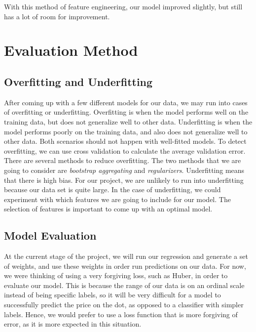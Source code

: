 \documentclass{article}
\begin{document}
With this method of feature engineering, our model improved slightly, but still has a lot of room for improvement.

\section{Evaluation Method}
\subsection{Overfitting and Underfitting}
After coming up with a few different models for our data, we may run into cases of overfitting or underfitting. Overfitting is when the model performs well on the training data, but does not generalize well to other data. Underfitting is when the model performs poorly on the training data, and also does not generalize well to other data. Both scenarios should not happen with well-fitted models. To detect overfitting, we can use cross validation to calculate the average validation error. There are several methods to reduce overfitting. The two methods that we are going to consider are \textit{bootstrap aggregating} and \textit{regularizers}. Underfitting means that there is high bias. For our project, we are unlikely to run into underfitting because our data set is quite large. In the case of underfitting, we could experiment with which features we are going to include for our model. The selection of features is important to come up with an optimal model.

\subsection{Model Evaluation}
At the current stage of the project, we will run our regression and generate a set of weights, and use these weights in order run predictions on our data. For now, we were thinking of using a very forgiving loss, such as Huber, in order to evaluate our model. This is because the range of our data is on an ordinal scale instead of being specific labels, so it will be very difficult for a model to successfully predict the price on the dot, as opposed to a classifier with simpler labels. Hence, we would prefer to use a loss function that is more forgiving of error, as it is more expected in this situation.
\end{document}
